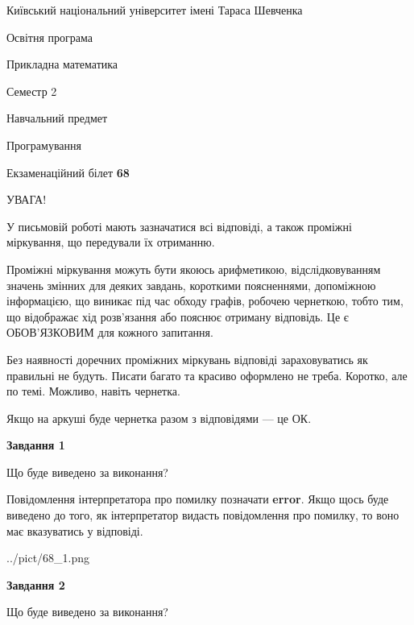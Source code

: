 \documentclass[12pt, ukrainian]{article}
\begin{document}
{{\begin {small}\par
{ \center  Київський національний університет імені Тараса Шевченка \par}
{\parbox {5 cm}{Освітня програма \hfill}{\parbox {7 cm}{Прикладна математика \hfill}}\parbox {6 cm}{\hfill Семестр 2}}\par
{\parbox {5 cm} {Навчальний предмет \hfill}\parbox {7 cm}{Програмування \hfill}\parbox {6cm}{\hfill}\par}\vspace{-7pt} \end{small}}{\center Екзаменаційний білет \No \textbf
{ 68 }\par}}
{
\begin {large}
УВАГА!

У письмовій роботі мають зазначатися всі відповіді, а також проміжні міркування, що передували їх отриманню.

Проміжні міркування можуть бути якоюсь арифметикою, відслідковуванням зна\-чень змінних для деяких завдань,
короткими поясненнями, допоміжною інформацією, що виникає під час обходу графів, робочею чернеткою,
тобто тим, що відображає хід розв’язання або пояснює отриману відповідь.
Це є ОБОВ’ЯЗКОВИМ для кожного запитання.

Без наявності доречних проміжних міркувань відповіді зараховуватись як правиль\-ні не будуть.
Писати багато та красиво оформлено не треба. Коротко, але по темі. Можли\-во, навіть чернетка.

Якщо на аркуші буде чернетка разом з відповідями --- це ОК.

\newpage

{\begin {center}\textbf{Завдання 1}\end {center}}\par
Що буде виведено за виконання?

Повідомлення інтерпретатора про помилку позначати \textbf{error}.
Якщо щось буде виведено до того, як інтерпретатор видасть повідомлення про помилку, 
то воно має вказуватись у відповіді. \par


\begin{center}
	{../pict/68_1.png}
\end{center}
\newpage

{\begin {center}\textbf{Завдання 2}\end {center}}\par
Що буде виведено за виконання?


\end{large}}
\end{document}

